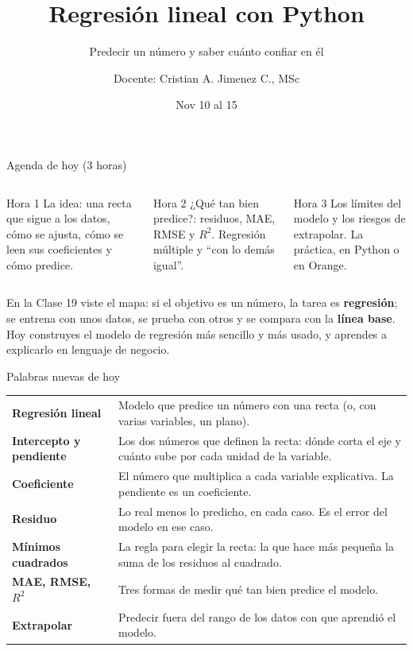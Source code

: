\documentclass[aspectratio=169,11pt]{beamer}
\title{Regresión lineal con Python}
\subtitle{Predecir un número y saber cuánto confiar en él}
\author{Docente: Cristian A. Jimenez C., MSc}
\date{Nov 10 al 15}
\begin{document}
{
\begin{frame}
  \titlepage
\end{frame}
}

\begin{frame}[t]{Agenda de hoy (3 horas)}
  \begin{columns}[T,onlytextwidth]
    \begin{block}{Hora 1}
      \small La idea: una recta que sigue a los datos, cómo se ajusta, cómo
      se leen sus coeficientes y cómo predice.
    \end{block}
    \begin{block}{Hora 2}
      \small ¿Qué tan bien predice?: residuos, MAE, RMSE y $R^2$. Regresión
      múltiple y ``con lo demás igual''.
    \end{block}
    \begin{block}{Hora 3}
      \small Los límites del modelo y los riesgos de extrapolar. La
      práctica, en Python o en Orange.
    \end{block}
  \end{columns}
  \vspace{0.3cm}
  \small En la Clase 19 viste el mapa: si el objetivo es un número, la
  tarea es \textbf{regresión}; se entrena con unos datos, se prueba con
  otros y se compara con la \textbf{línea base}. Hoy construyes el modelo
  de regresión más sencillo y más usado, y aprendes a explicarlo en
  lenguaje de negocio.
\end{frame}

\begin{frame}[t]{Palabras nuevas de hoy}
  \footnotesize
  \renewcommand{\arraystretch}{1.18}
  \begin{tabular}{@{}L{3.4cm}L{10.1cm}@{}}
    \toprule
    \textbf{Regresión lineal} & Modelo que predice un número con una recta (o, con varias variables, un plano). \\
    \textbf{Intercepto y pendiente} & Los dos números que definen la recta: dónde corta el eje y cuánto sube por cada unidad de la variable. \\
    \textbf{Coeficiente} & El número que multiplica a cada variable explicativa. La pendiente es un coeficiente. \\
    \textbf{Residuo} & Lo real menos lo predicho, en cada caso. Es el error del modelo en ese caso. \\
    \textbf{Mínimos cuadrados} & La regla para elegir la recta: la que hace más pequeña la suma de los residuos al cuadrado. \\
    \textbf{MAE, RMSE, $R^2$} & Tres formas de medir qué tan bien predice el modelo. \\
    \textbf{Extrapolar} & Predecir fuera del rango de los datos con que aprendió el modelo. \\
    \bottomrule
  \end{tabular}
\end{frame}
\end{document}
